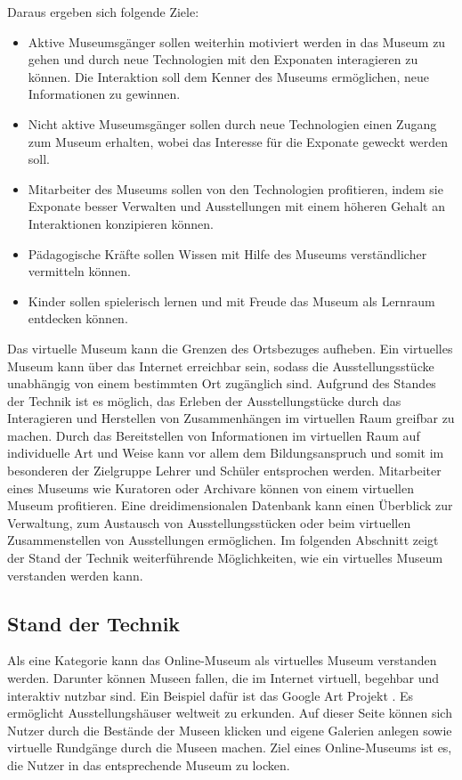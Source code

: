 \documentclass[runningheads,a4paper, 12pt]{llncs}
\begin{document}
Daraus ergeben sich folgende Ziele:
\begin{itemize}
	\item Aktive Museumsgänger sollen weiterhin motiviert werden in das Museum zu gehen und durch neue Technologien mit den Exponaten interagieren zu können. Die Interaktion soll dem Kenner des Museums ermöglichen, neue Informationen zu gewinnen.
	\item Nicht aktive Museumsgänger sollen durch neue Technologien einen Zugang zum Museum erhalten, wobei das Interesse für die Exponate geweckt werden soll.
	\item Mitarbeiter des Museums sollen von den Technologien profitieren, indem sie Exponate besser Verwalten und Ausstellungen mit einem höheren Gehalt an Interaktionen konzipieren können.
	\item Pädagogische Kräfte sollen Wissen mit Hilfe des Museums verständlicher vermitteln können.
	\item Kinder sollen spielerisch lernen und mit Freude das Museum als Lernraum entdecken können.\\
	
\end{itemize}

Das virtuelle Museum kann die Grenzen des Ortsbezuges aufheben. Ein virtuelles Museum kann über das Internet erreichbar sein, sodass die Ausstellungsstücke unabhängig von einem bestimmten Ort zugänglich sind. Aufgrund des Standes der Technik ist es möglich, das Erleben der Ausstellungstücke durch das Interagieren und Herstellen von Zusammenhängen im virtuellen Raum greifbar zu machen. Durch das Bereitstellen von Informationen im virtuellen Raum auf individuelle Art und Weise kann vor allem dem Bildungsanspruch und somit im besonderen der Zielgruppe Lehrer und Schüler entsprochen werden. Mitarbeiter eines Museums wie Kuratoren oder Archivare können von einem virtuellen Museum profitieren. Eine dreidimensionalen Datenbank kann einen Überblick zur Verwaltung, zum Austausch von Ausstellungsstücken oder beim virtuellen Zusammenstellen von Ausstellungen ermöglichen. Im folgenden Abschnitt zeigt der Stand der Technik weiterführende Möglichkeiten, wie ein virtuelles Museum verstanden werden kann.\\

\subsection{Stand der Technik} \label{sect:standtechnik}
Als eine Kategorie kann das Online-Museum als virtuelles Museum verstanden werden. Darunter können Museen fallen, die im Internet virtuell, begehbar und interaktiv nutzbar sind. Ein Beispiel dafür ist das Google Art Projekt \cite{GoogleCultureInstitut.2011}. Es ermöglicht Ausstellungshäuser weltweit zu erkunden. Auf dieser Seite können sich Nutzer durch die Bestände der Museen klicken und eigene Galerien anlegen sowie virtuelle Rundgänge durch die Museen machen. Ziel eines Online-Museums ist es, die Nutzer in das entsprechende Museum zu locken.\\ 
\end{document}
